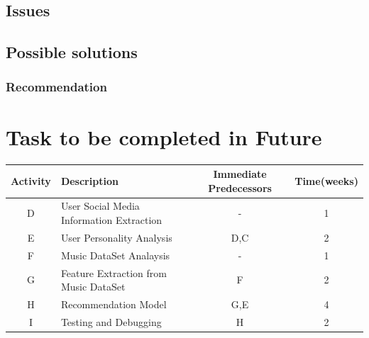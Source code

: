 \documentclass[a4paper, 12pt, onepage]{article}
\begin{document}
      \subsection{Issues}
      \subsection{Possible solutions}
      \subsubsection{Recommendation}
      \section{Task to be completed in Future}
	\begin{center}
		\begin{tabular}{|c|l|c|c|}
			\hline
				Activity & Description & Immediate Predecessors&Time(weeks)\\
			\hline
			D&User Social Media Information Extraction&-&1\\
			\hline
			E&User Personality Analysis&D,C&2\\
			\hline
			F&Music DataSet Analaysis&-&1 \\
			\hline
			G&Feature Extraction from Music DataSet&F&2\\
			\hline
			H&Recommendation Model&G,E&4\\
			\hline
			I&Testing and Debugging&H&2\\
			\hline
		\end{tabular}
	\end{center}
\end{document}
